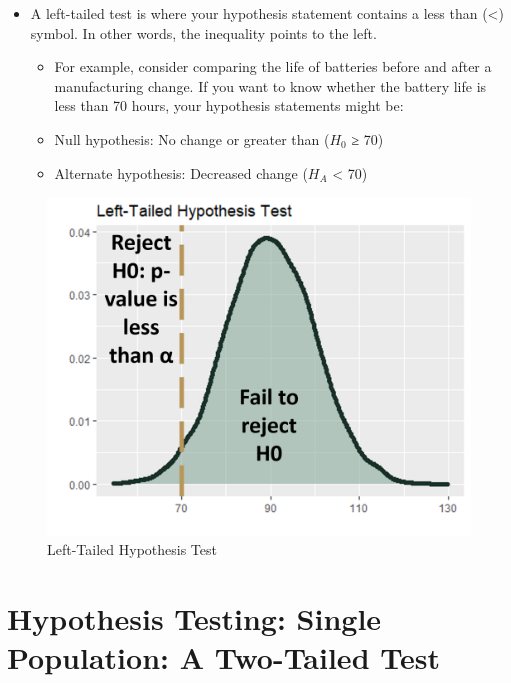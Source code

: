 \documentclass[
  letterpaper,
  DIV=11,
  numbers=noendperiod]{scrreprt}
\providecommand{\tightlist}{%
  \setlength{\itemsep}{0pt}\setlength{\parskip}{0pt}}\usepackage{longtable,booktabs,array}
\begin{document}
\begin{itemize}
\tightlist
\item
  A left-tailed test is where your hypothesis statement contains a less
  than (\textless) symbol. In other words, the inequality points to the
  left.

  \begin{itemize}
  \tightlist
  \item
    For example, consider comparing the life of batteries before and
    after a manufacturing change. If you want to know whether the
    battery life is less than 70 hours, your hypothesis statements might
    be:
  \item
    Null hypothesis: No change or greater than (\(H_0\) ≥ 70)
  \item
    Alternate hypothesis: Decreased change (\(H_A\) \textless{} 70)
  \end{itemize}
\end{itemize}

\begin{figure}[H]

{\centering \includegraphics{Pictures/Ch6/LeftTailedHTest.png}

}

\caption{Left-Tailed Hypothesis Test}

\end{figure}%

\section{Hypothesis Testing: Single Population: A Two-Tailed
Test}\label{hypothesis-testing-single-population-a-two-tailed-test}
\end{document}
